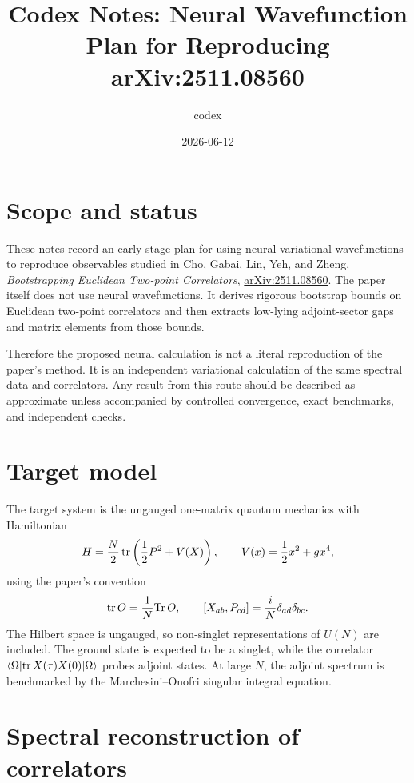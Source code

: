 \documentclass[11pt]{article}
\title{Codex Notes: Neural Wavefunction Plan for Reproducing arXiv:2511.08560}
\author{codex}
\date{2026-06-12}
\begin{document}
\maketitle

\section{Scope and status}

These notes record an early-stage plan for using neural variational wavefunctions
to reproduce observables studied in Cho, Gabai, Lin, Yeh, and Zheng,
\emph{Bootstrapping Euclidean Two-point Correlators},
\href{https://arxiv.org/abs/2511.08560}{arXiv:2511.08560}.
The paper itself does not use neural wavefunctions.  It derives rigorous
bootstrap bounds on Euclidean two-point correlators and then extracts low-lying
adjoint-sector gaps and matrix elements from those bounds.

Therefore the proposed neural calculation is not a literal reproduction of the
paper's method.  It is an independent variational calculation of the same
spectral data and correlators.  Any result from this route should be described
as approximate unless accompanied by controlled convergence, exact benchmarks,
and independent checks.

\section{Target model}

The target system is the ungauged one-matrix quantum mechanics with Hamiltonian
\begin{equation}
  H = \frac{N}{2}\,{\rm tr}\left(\frac{1}{2}P^2 + V(X)\right),
  \qquad
  V(x) = \frac{1}{2}x^2 + g x^4 ,
\end{equation}
using the paper's convention
\begin{equation}
  {\rm tr}\,O = \frac{1}{N}{\rm Tr}\,O,\qquad
  [X_{ab},P_{cd}] = \frac{i}{N}\delta_{ad}\delta_{bc}.
\end{equation}
The Hilbert space is ungauged, so non-singlet representations of \(U(N)\) are
included.  The ground state is expected to be a singlet, while the correlator
\(\langle \Omega|{\rm tr}\,X(\tau)X(0)|\Omega\rangle\) probes adjoint states.
At large \(N\), the adjoint spectrum is benchmarked by the
Marchesini--Onofri singular integral equation.

\section{Spectral reconstruction of correlators}
\end{document}
